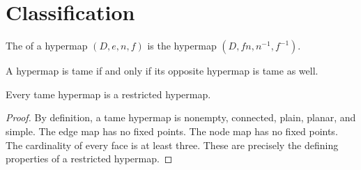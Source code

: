 
\section{Classification}
\label{sec:proof-classification}

\label{sec:classification}




\begin{definition}[opposite]
The  of a hypermap $(D,e,n,f)$ is the
hypermap $(D,f n,n^{-1},f^{-1})$.
%
\end{definition}

\begin{lemma}[]
A hypermap is tame if and only if its opposite hypermap is tame as well.
\end{lemma}

\begin{lemma}[]
Every tame hypermap is a restricted hypermap.
\end{lemma}

\begin{proof}
  By definition, a tame hypermap is nonempty, connected, plain,
  planar, and simple.  The edge map has no fixed points.  The node map
  has no fixed points.  The cardinality of every face is at least
  three.  These are precisely the defining properties of a restricted
  hypermap.
\end{proof}


